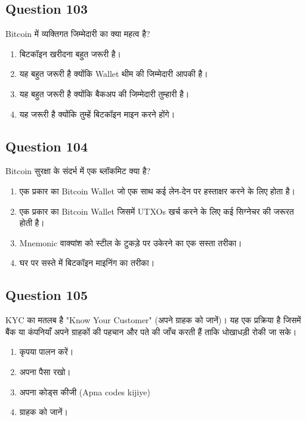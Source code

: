 \documentclass[12pt,a4paper]{article}
\begin{document}
\bigskip


\subsection*{Question 103}
Bitcoin में व्यक्तिगत जिम्मेदारी का क्या महत्व है?

\begin{enumerate}[label=\Alph*., leftmargin=*]
\item बिटकॉइन खरीदना बहुत जरूरी है।
\item यह बहुत जरूरी है क्योंकि Wallet थीम की जिम्मेदारी आपकी है।
\item यह बहुत जरूरी है क्योंकि बैकअप की जिम्मेदारी तुम्हारी है।
\item यह जरूरी है क्योंकि तुम्हें बिटकॉइन माइन करने होंगे।
\end{enumerate}

\bigskip


\subsection*{Question 104}
Bitcoin सुरक्षा के संदर्भ में एक ब्लॉकमिट क्या है?

\begin{enumerate}[label=\Alph*., leftmargin=*]
\item एक प्रकार का Bitcoin Wallet जो एक साथ कई लेन-देन पर हस्ताक्षर करने के लिए होता है।
\item एक प्रकार का Bitcoin Wallet जिसमें UTXOs खर्च करने के लिए कई सिग्नेचर की जरूरत होती है।
\item Mnemonic वाक्यांश को स्टील के टुकड़े पर उकेरने का एक सस्ता तरीका।
\item घर पर सस्ते में बिटकॉइन माइनिंग का तरीका।
\end{enumerate}

\bigskip


\subsection*{Question 105}
KYC का मतलब है "Know Your Customer" (अपने ग्राहक को जानें)। यह एक प्रक्रिया है जिसमें बैंक या कंपनियाँ अपने ग्राहकों की पहचान और पते की जाँच करती हैं ताकि धोखाधड़ी रोकी जा सके।

\begin{enumerate}[label=\Alph*., leftmargin=*]
\item कृपया पालन करें।
\item अपना पैसा रखो।
\item अपना कोड्स कीजी (Apna codes kijiye)
\item ग्राहक को जानें।
\end{enumerate}
\end{document}
